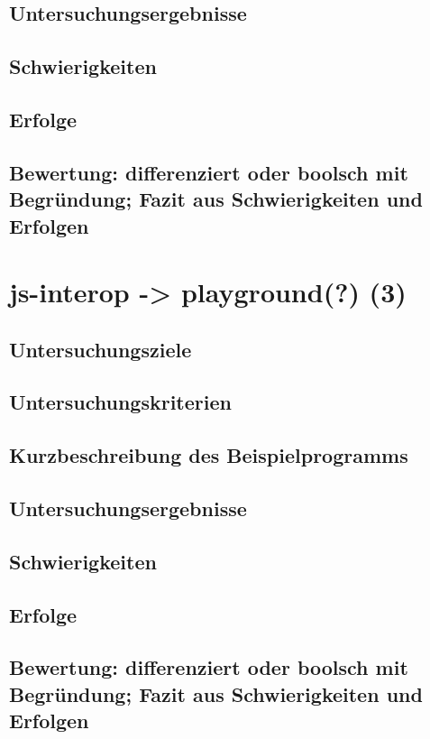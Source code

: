 \documentclass[a4paper, 12pt, hidelinks, listof=totoc, listoftables=totoc, bibliography=totoc]{scrreprt}
\begin{document}
\subsection{Untersuchungsergebnisse}
\subsection{Schwierigkeiten}
\subsection{Erfolge}
\subsection{Bewertung: differenziert oder boolsch mit Begründung; Fazit aus Schwierigkeiten und Erfolgen}

\section{js-interop -> playground(?) (3)}

\subsection{Untersuchungsziele}
\subsection{Untersuchungskriterien}
\subsection{Kurzbeschreibung des Beispielprogramms}
\subsection{Untersuchungsergebnisse}
\subsection{Schwierigkeiten}
\subsection{Erfolge}
\subsection{Bewertung: differenziert oder boolsch mit Begründung; Fazit aus Schwierigkeiten und Erfolgen}
\end{document}
